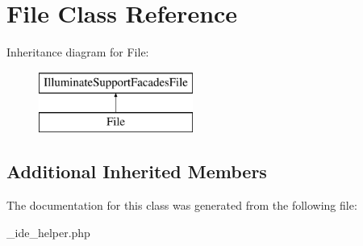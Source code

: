 \hypertarget{class_file}{}\section{File Class Reference}
\label{class_file}
Inheritance diagram for File\+:\begin{figure}[H]
\begin{center}
\leavevmode
\includegraphics[height=2.000000cm]{class_file}
\end{center}
\end{figure}
\subsection*{Additional Inherited Members}


The documentation for this class was generated from the following file\+:\begin{DoxyCompactItemize}
\item 
\+\_\+ide\+\_\+helper.\+php\end{DoxyCompactItemize}

